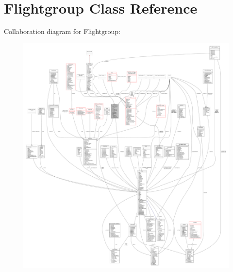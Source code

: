 \hypertarget{classFlightgroup}{}\section{Flightgroup Class Reference}
\label{classFlightgroup}


Collaboration diagram for Flightgroup\+:
\nopagebreak
\begin{figure}[H]
\begin{center}
\leavevmode
\includegraphics[width=350pt]{d4/dba/classFlightgroup__coll__graph}
\end{center}
\end{figure}

